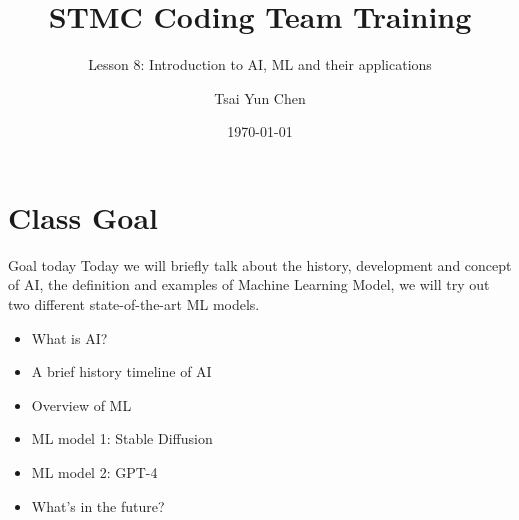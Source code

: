 \documentclass[10pt,xcolor={table,dvipsnames},t]{beamer}
\title[Your Short Title]{STMC Coding Team Training}
\subtitle{Lesson 8: Introduction to AI, ML and their applications}
\author{Tsai Yun Chen}
\date{\today}
\begin{document}
\begin{frame}
  \titlepage
\end{frame}


\section{Class Goal}

\begin{frame}{Goal today}
Today we will briefly talk about the history, development and concept of AI, the definition and examples of Machine Learning Model, we will try out two different state-of-the-art ML models.
\begin{itemize}
  \item What is AI?
  \item A brief history timeline of AI
  \item Overview of ML
  \item ML model 1: Stable Diffusion
  \item ML model 2: GPT-4
  \item What's in the future?
\end{itemize}
\end{frame}
\end{document}

